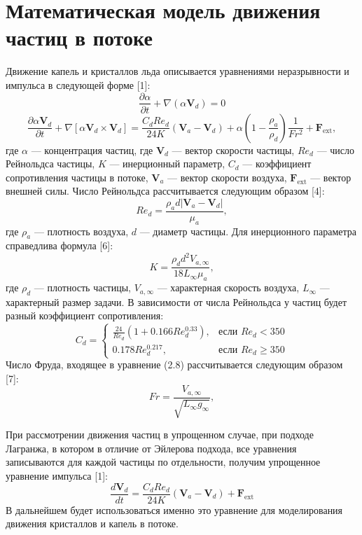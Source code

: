 \section{Математическая модель движения частиц в потоке}

Движение капель и кристаллов льда описывается уравнениями неразрывности и импульса в следующей форме [1]:
\begin{equation}
	\frac{\partial \alpha}{\partial t}+\nabla(\alpha \mathbf{V}_d)=0
\end{equation}
\begin{equation}
	\frac{\partial \alpha \mathbf{V}_d}{\partial t}+\nabla[\alpha \mathbf{V}_d \times \mathbf{V}_d]= \frac{C_d Re_d}{24K} (\mathbf{V}_a - \mathbf{V}_d)+\alpha\left(1-\frac{\rho_a}{\rho_d}\right)\frac{1}{Fr^2} + \mathbf{F}_{\text{ext}},
\end{equation}
где $\alpha$ --- концентрация частиц, где $\mathbf{V}_d$ --- вектор скорости частицы, $Re_d$ --- число Рейнольдса частицы, $K$ — инерционный параметр, $C_d$ --- коэффициент сопротивления частицы в потоке, $\mathbf{V}_a$ --- вектор скорости воздуха, $\mathbf{F}_{\text{ext}}$ --- вектор внешней силы. Число Рейнольдса рассчитывается следующим образом [4]:
\begin{equation}
	{Re_d} = \frac{\rho_a d \left| \mathbf{V}_a - \mathbf{V}_d \right|}{\mu_a},
\end{equation}
где $\rho_a$ --- плотность воздуха, $d$ --- диаметр частицы. Для инерционного параметра справедлива формула [6]:
\begin{equation}
	{K} = \frac{\rho_d d^2 V_{a,\infty}}{18 L_\infty \mu_a},
\end{equation}
где $\rho_d$ --- плотность частицы, $V_{a,\infty}$ --- характерная скорость воздуха, $L_\infty$ --- характерный размер задачи. В зависимости от числа Рейнольдса у частиц будет разный коэффициент сопротивления:
\begin{equation}
	C_d = 
	\begin{cases}
		\frac{24} {Re_d} (1 + 0.166 Re_d^{0.33}), & \text{если } Re_d < 350 \\
		0.178 Re_d^{0.217},  & \text{если } Re_d \geq 350
	\end{cases}
\end{equation}
Число Фруда, входящее в уравнение (2.8) рассчитывается следующим образом [7]:
\begin{equation}
	Fr = \frac{V_{a,\infty}}{\sqrt{L_\infty g_\infty}},
\end{equation}

При рассмотрении движения частиц в упрощенном случае, при подходе Лагранжа, в котором в отличие от Эйлерова подхода, все уравнения записываются для каждой частицы по отдельности, получим упрощенное уравнение импульса [1]: 
\begin{equation}
	\frac{d \mathbf{V}_d}{d t} = \frac{C_d Re_d}{24K} (\mathbf{V}_a - \mathbf{V}_d) + \mathbf{F}_{\text{ext}}
\end{equation}
В дальнейшем будет использоваться именно это уравнение для моделирования движения кристаллов и капель в потоке.





